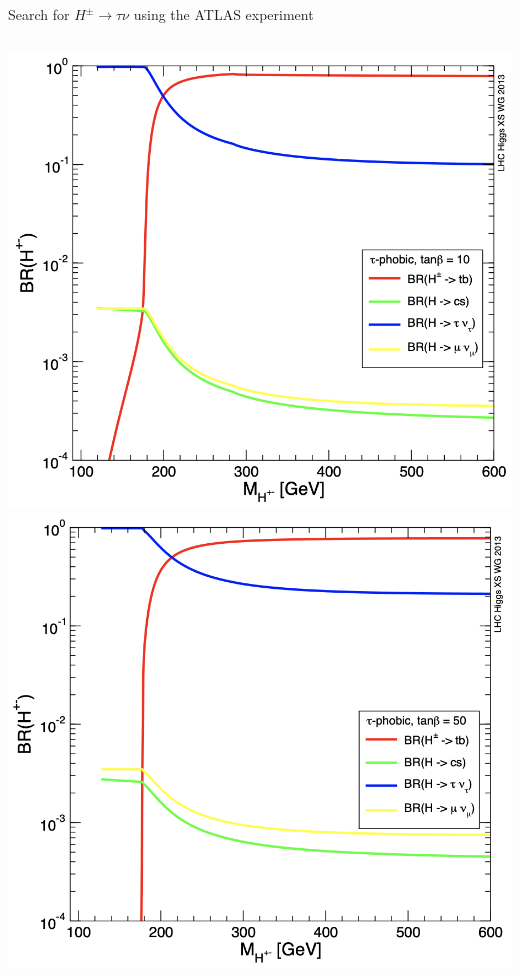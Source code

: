 \documentclass[aspectratio=169,xcolor=table]{beamer}
\newcommand{\Hp}{\ensuremath{H^{\pm}}\xspace}
\newcommand{\HpLong}{\ensuremath{\Hp \rightarrow \tau \nu}\xspace}
\begin{document}
\begin{frame}[t]{Search for \HpLong using the ATLAS experiment}
\begin{columns}
      \centering
      \includegraphics[width=1.15\linewidth,keepaspectratio=true]{Charged_Higgs_BR.png}
      \includegraphics[width=1.15\linewidth,keepaspectratio=true]{HPlus_taunu_tanB.png}
      \end{columns}
    \end{frame} 
\end{document}
